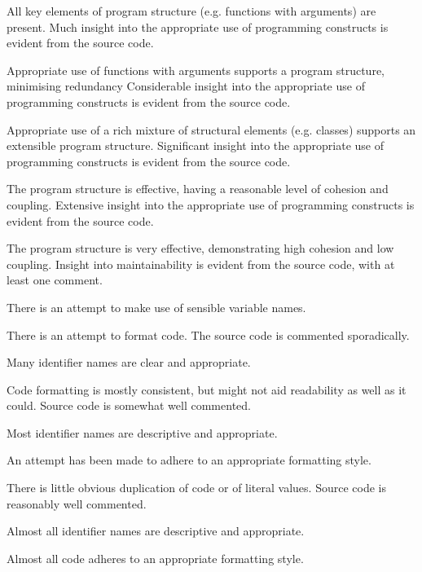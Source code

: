 \documentclass{../../fal_assignment}
\begin{document}
\begin{markingrubric}
            \par All key elements of program structure (e.g. functions with arguments) are present.
        \grade Much insight into the appropriate use of programming constructs is evident from the source code.
            \par Appropriate use of functions with arguments supports a program structure, minimising redundancy
        \grade Considerable insight into the appropriate use of programming constructs is evident from the source code.
            \par Appropriate use of a rich mixture of structural elements (e.g. classes) supports an extensible program structure.
        \grade Significant insight into the appropriate use of programming constructs is evident from the source code.
            \par The program structure is effective, having a reasonable level of cohesion and coupling.
        \grade Extensive insight into the appropriate use of programming constructs is evident from the source code.
            \par The program structure is very effective, demonstrating high cohesion and low coupling.
%
        \grade\fail Insight into maintainability is evident from the source code, with at least one comment.
            \par There is an attempt to make use of sensible variable names.
            \par There is an attempt to format code.
        \grade The source code is commented sporadically.
            \par Many identifier names are clear and appropriate.
            \par Code formatting is mostly consistent, but might not aid readability as well as it could.
        \grade Source code is somewhat well commented.
            \par Most identifier names are descriptive and appropriate.
            \par An attempt has been made to adhere to an appropriate formatting style.
             \par There is little obvious duplication of code or of literal values.           
        \grade Source code is reasonably well commented.
            \par Almost all identifier names are descriptive and appropriate.
            \par Almost all code adheres to an appropriate formatting style.

\end{markingrubric}
\end{document}
